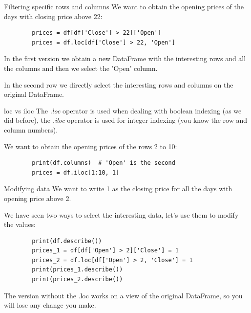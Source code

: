 \documentclass[aspectratio=169,handout]{beamer}
\begin{document}
\begin{frame}[fragile]{Filtering specific rows and columns}
    We want to obtain the opening prices of the days with closing price above 22:
    \begin{verbatim}
        prices = df[df['Close'] > 22]['Open']
        prices = df.loc[df['Close'] > 22, 'Open']
    \end{verbatim}

    In the first version we obtain a new DataFrame with the interesting rows and all the columns and then we select the
    'Open' column.

    In the second row we directly select the interesting rows and columns on the original DataFrame.
\end{frame}

\begin{frame}[fragile]{loc vs iloc}
    The \emph{.loc} operator is used when dealing with boolean indexing (as we did before), the \emph{.iloc} operator is
    used for integer indexing (you know the row and column numbers).

    We want to obtain the opening prices of the rows 2 to 10:
    \begin{verbatim}
        print(df.columns)  # 'Open' is the second
        prices = df.iloc[1:10, 1]
    \end{verbatim}
\end{frame}

\begin{frame}[fragile]{Modifying data}
    We want to write 1 as the closing price for all the days with opening price above 2.

    We have seen two ways to select the interesting data, let's use them to modify the values:
    \begin{verbatim}
        print(df.describe())
        prices_1 = df[df['Open'] > 2]['Close'] = 1
        prices_2 = df.loc[df['Open'] > 2, 'Close'] = 1
        print(prices_1.describe())
        print(prices_2.describe())
    \end{verbatim}

    \pause
    The version without the .loc works on a view of the original DataFrame, so you will lose any change you make.
\end{frame}
\end{document}
